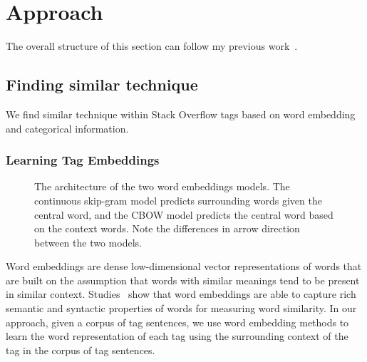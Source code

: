 \section{Approach}
\label{sec:approach}

The overall structure of this section can follow my previous work~\cite{chen2017unsupervised}.

\subsection{Finding similar technique}

We find similar technique within Stack Overflow tags based on word embedding and categorical information.

\subsubsection{Learning Tag Embeddings}
\label{sec:w2v}

\begin{figure}
	\centering
	\hfill
	\caption{The architecture of the two word embeddings models. The continuous skip-gram model predicts surrounding words given the central word, and the CBOW model predicts the central word based on the context words. Note the differences in arrow direction between the two models.
	}
	\label{fig:w2v}
\end{figure}

Word embeddings are dense low-dimensional vector representations of words that are built on the assumption that words with similar meanings tend to be present in similar context.
Studies~\cite{turian2010word, mikolov2013efficient} show that word embeddings are able to capture rich semantic and syntactic properties of words for measuring word similarity.
In our approach, given a corpus of tag sentences, we use word embedding methods to learn the word representation of each tag using the surrounding context of the tag in the corpus of tag sentences.



